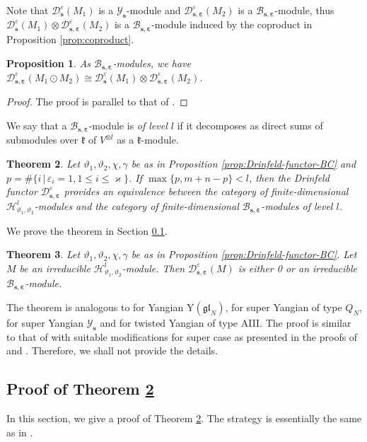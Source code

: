 \documentclass[11pt,reqno]{amsart}
\numberwithin{equation}{section}
\newtheorem{thm}{Theorem}[section]
\newtheorem{prop}[thm]{Proposition}
\theoremstyle{definition}
\theoremstyle{remark}
\newcommand{\mc}{\mathcal}
\newcommand{\gl}{\mathfrak{gl}}
\newcommand{\lle}{\leqslant}
\newcommand{\YMN}{{\mathscr{Y}_{\bm s}}}
\newcommand{\BMN}{{\mathscr{B}_{\bm s,\bm \ve}}}
\newcommand{\ka}{\varkappa}
\newcommand{\ve}{\varepsilon}
\newcommand{\s}{{\bm s}}
\begin{document}
Note that $\mc D^\ve_\s(M_1)$ is a $\YMN$-module and $\mc D^\ve_{\s,\bm\ve}(M_2)$ is a $\BMN$-module, thus $\mc D^\ve_\s(M_1)\otimes\mc D^\ve_{\s,\bm\ve}(M_2)$ is a $\BMN$-module induced by the coproduct in Proposition \ref{prop:coproduct}.

\begin{prop}\label{prop:DF-coproduct}
As $\BMN$-modules, we have $\mc D_{\s,\bm \ve}^\ve(M_1\odot M_2)\cong \mc D^\ve_\s(M_1)\otimes\mc D^\ve_{\s,\bm\ve}(M_2)$.
\end{prop}
\begin{proof}
The proof is parallel to that of \cite[Porposition 4.6]{Chen2014twisted}.
\end{proof}

We say that a $\BMN$-module is \textit{of level $l$} if it decomposes as direct sums of submodules over $\mathfrak k$ of $V^{\otimes l}$ as a $\mathfrak k$-module.


\begin{thm}\label{thm:Drinfeld-B}
Let $\vartheta_1,\vartheta_2,\chi,\gamma$ be as in Proposition \ref{prop:Drinfeld-functor-BC} and $p=\# \{i\,|\, \ve_i=1, 1\lle i\lle \ka\}$. If $\max\{p,m+n-p\}< l$, then the Drinfeld functor $\mc D_{\s,\bm\ve}^\ve$ provides an equivalence between the category of finite-dimensional $\mathscr H_{\vartheta_1,\vartheta_2}^l$-modules and the category of finite-dimensional $\BMN$-modules of level $l$.
\end{thm}
We prove the theorem in Section \ref{app:B}.

\begin{thm}\label{thm:Drinfeld-simple}
Let $\vartheta_1,\vartheta_2,\chi,\gamma$ be as in Proposition \ref{prop:Drinfeld-functor-BC}. Let $M$ be an irreducible $\mathscr H_{\vartheta_1,\vartheta_2}^l$-module. Then $\mc D_{\s,\bm \ve}^\ve(M)$ is either 0 or an irreducible $\BMN$-module.
\end{thm}
The theorem is analogous to \cite[Theorem 11]{Arakawa1999} for Yangian $\mathrm{Y}(\gl_N)$, \cite[Theorem 5.5]{Nazarov1999queer} for super Yangian of type $Q_N$, \cite[Proposition 4.8]{Lu2021jacobi} for super Yangian $\YMN$ and \cite[Theorem 4.7]{Chen2014twisted} for twisted Yangian of type AIII. The proof is similar to that of \cite[Theorem 4.7]{Chen2014twisted} with suitable modifications for super case as presented in the proofs of \cite[Theorem 5.5]{Nazarov1999queer} and \cite[Proposition 4.8]{Lu2021jacobi}. Therefore, we shall not provide the details.

\subsection{Proof of Theorem \ref{thm:Drinfeld-B}}\label{app:B}
In this section, we give a proof of Theorem \ref{thm:Drinfeld-B}. The strategy is essentially the same as in \cite{Chen2014twisted}.
\end{document}
